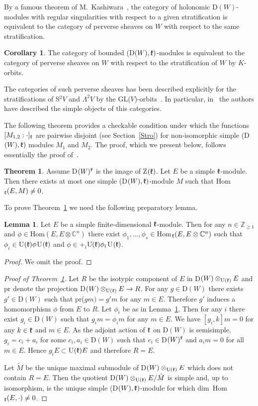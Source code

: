 \documentclass[12pt]{amsart}
\theoremstyle{definition}\newtheorem{theorem}{Theorem}[section]
\newtheorem{lemma}[proposition]{Lemma}
\newtheorem{corollary}[proposition]{Corollary}
\theoremstyle{definition}\newtheorem{definition}[proposition]{Definition}
\theoremstyle{remark}\newtheorem{example}[proposition]{Example}
\renewcommand{\to}[1][]{\xrightarrow{#1}}
\begin{document}
By a famous theorem of M.~Kashiwara~\cite{Ka2}, the category of holonomic D$(W)$-modules with regular singularities with respect to a given stratification is equivalent to the category of perverse sheaves on $W$ with respect to the same stratification.
\begin{corollary} The category of bounded (D($W), \frak k)$-modules is equivalent to the category of perverse sheaves on $W$ with respect to the stratification of $W$ by $K$-orbits.\end{corollary}
The categories of such perverse sheaves has been described explicitly for the stratifications of S$^2V$ and $\Lambda^2V$ by the GL($V$)-orbits~\cite{BG}. In particular, in~\cite{BG} the authors have described the simple objects of this categories.

The following theorem provides a checkable condition under which the functions $[M_{1,2}:\cdot]_\frak k$ are pairwise disjoint (see Section~\ref{Stro}) for non-isomorphic simple (D$(W), \frak k)$ modules $M_1$ and $M_2$. The proof, which we present below, follows essentially the proof of~\cite[Corollary 5.8]{PS2}.
\begin{theorem}\label{T1m} Assume D$(W)^\frak k$ is the image of Z$(\frak k)$. Let $E$ be a simple $\frak k$-module. Then there exists at most one simple (D$(W), \frak k)$-module $M$ such that Hom$_\frak k(E, M)\ne0$.\end{theorem}
To prove Theorem~\ref{T1m} we need the following preparatory lemma.
\begin{lemma}\label{L96}Let $E$ be a simple finite-dimensional $\frak k$-module. Then for any $n\in\mathbb Z_{\ge1}$ and $\phi\in$Hom$(E, E\otimes \mathbb C^n)$ there exist $\phi_1,..., \phi_s\in$Hom$_\frak k(E, E\otimes\mathbb C^n)$ such that $\phi_i\in$U$(\frak k)\phi$U$(\frak k)$ and $\phi\in+_i$U$(\frak k)\phi_i$U$(\frak k)$.\end{lemma}
\begin{proof}We omit the proof.\end{proof}
\begin{proof}[Proof of Theorem~\ref{T1m}]Let $R$ be the isotypic component of $E$ in D$(W)\otimes_{\mathrm U(\frak k)}E$ and pr denote the projection D$(W)\otimes_{\mathrm U(\frak k)}E\to R$. For any $g\in$D$(W)$ there exists $g'\in$D$(W)$ such that pr($gm)=g'm$ for any $m\in E$. Therefore $g'$ induces a homomorphism $\phi$ from $E$ to $R$. Let $\phi_i$ be as in Lemma~\ref{L96}. Then for any $i$ there exist $g_i\in$D$(W)$ such that $g_im=\phi_im$ for any $m\in E$. We have $[g_i, k]m=0$ for any $k\in\frak k$ and $m\in E$. As the adjoint action of $\frak k$ on D$(W)$ is semisimple, $g_i=c_i+a_i$ for some $c_i, a_i\in$D$(W)$ such that $c_i\in$D$(W)^\frak k$ and $a_im=0$ for all $m\in E$. Hence $g_iE\subset$U$(\frak k)E$ and therefore $R=E$.

Let $\tilde M$ be the unique maximal submodule of D$(W)\otimes_{\mathrm U(\frak k)}E$ which does not contain $R=E$. Then the quotient D$(W)\otimes_{\mathrm U(\frak k)}E/\tilde M$ is simple and, up to isomorphism, is the unique simple (D$(W), \frak k)$-module for which dim~Hom$_\frak k(E,\cdot)\ne 0$.\end{proof}
\end{document}
